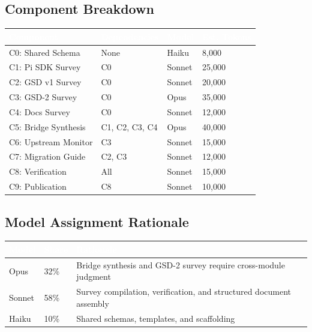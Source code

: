 \documentclass[11pt,letterpaper]{article}
\newcommand{\tableheader}[1]{\textbf{\sffamily\textcolor{white}{#1}}}
\begin{document}
\subsection{Component Breakdown}

\begin{center}
\begin{tabularx}{\textwidth}{L{3.5cm}L{2cm}C{1.5cm}C{2cm}}
\toprule
{}
\tableheader{Component} & \tableheader{Dependencies} & \tableheader{Model} & \tableheader{Est. Tokens} \\
\midrule
C0: Shared Schema & None & Haiku & 8,000 \\
C1: Pi SDK Survey & C0 & Sonnet & 25,000 \\
C2: GSD v1 Survey & C0 & Sonnet & 20,000 \\
C3: GSD-2 Survey & C0 & Opus & 35,000 \\
C4: Docs Survey & C0 & Sonnet & 12,000 \\
C5: Bridge Synthesis & C1, C2, C3, C4 & Opus & 40,000 \\
C6: Upstream Monitor & C3 & Sonnet & 15,000 \\
C7: Migration Guide & C2, C3 & Sonnet & 12,000 \\
C8: Verification & All & Sonnet & 15,000 \\
C9: Publication & C8 & Sonnet & 10,000 \\
\bottomrule
\end{tabularx}
\end{center}

\subsection{Model Assignment Rationale}

\begin{center}
\begin{tabularx}{\textwidth}{C{1.5cm}C{1.5cm}X}
\toprule
{}
\tableheader{Model} & \tableheader{Share} & \tableheader{Rationale} \\
\midrule
Opus & 32\% & Bridge synthesis and GSD-2 survey require cross-module judgment \\
Sonnet & 58\% & Survey compilation, verification, and structured document assembly \\
Haiku & 10\% & Shared schemas, templates, and scaffolding \\
\bottomrule
\end{tabularx}
\end{center}
\end{document}
